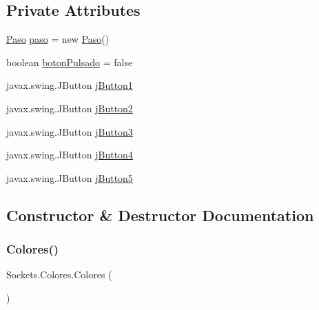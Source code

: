 \subsection*{Private Attributes}
\begin{DoxyCompactItemize}
\item 
\mbox{\hyperlink{class_sockets_1_1_paso}{Paso}} \mbox{\hyperlink{class_sockets_1_1_colores_adf9fafb3fd2b7cdd9e555b80d94df744}{paso}} = new \mbox{\hyperlink{class_sockets_1_1_paso}{Paso}}()
\item 
boolean \mbox{\hyperlink{class_sockets_1_1_colores_ab9176a60b5bc0b70d94a23d9c1a448cd}{boton\+Pulsado}} = false
\item 
javax.\+swing.\+J\+Button \mbox{\hyperlink{class_sockets_1_1_colores_ab40711ac8b3b4ea81488754689d89db6}{j\+Button1}}
\item 
javax.\+swing.\+J\+Button \mbox{\hyperlink{class_sockets_1_1_colores_a4f1d1e8c1b92fee9bca285f52bf66b84}{j\+Button2}}
\item 
javax.\+swing.\+J\+Button \mbox{\hyperlink{class_sockets_1_1_colores_a7bba899d5ca449162ba9e0b7b3ae4264}{j\+Button3}}
\item 
javax.\+swing.\+J\+Button \mbox{\hyperlink{class_sockets_1_1_colores_ac555b14a5e9aa5fd552356f04d884d31}{j\+Button4}}
\item 
javax.\+swing.\+J\+Button \mbox{\hyperlink{class_sockets_1_1_colores_a4cacc03eb161c98ee51cfdd6970ecd35}{j\+Button5}}
\end{DoxyCompactItemize}


\subsection{Constructor \& Destructor Documentation}
\mbox{\label{class_sockets_1_1_colores_a1d4e4f3b911aef7557c9dacd277afd67}} 
\subsubsection{\texorpdfstring{Colores()}{Colores()}}
{\footnotesize\ttfamily Sockets.\+Colores.\+Colores (\begin{DoxyParamCaption}{ }\end{DoxyParamCaption})\hspace{0.3cm}{\ttfamily [inline]}}

